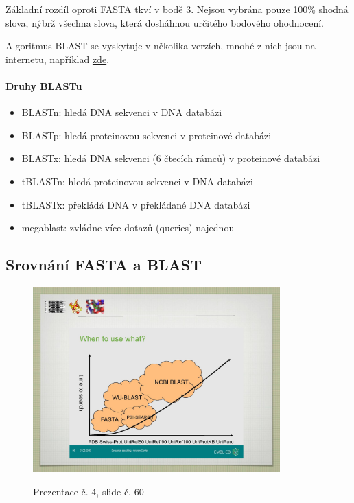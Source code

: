 \documentclass[DIV=8]{scrreprt}
\begin{document}
Základní rozdíl oproti FASTA tkví v bodě 3. Nejsou vybrána pouze 100\% shodná slova, nýbrž všechna slova, která dosháhnou určitého bodového ohodnocení.

Algoritmus BLAST se vyskytuje v několika verzích, mnohé z nich jsou na internetu, například \href{https://blast.ncbi.nlm.nih.gov/Blast.cgi}{zde}.

\paragraph{Druhy BLASTu}
\begin{itemize}[nosep]
    \item BLASTn: hledá DNA sekvenci v DNA databázi
    \item BLASTp: hledá proteinovou sekvenci v proteinové databázi
    \item BLASTx: hledá DNA sekvenci (6 čtecích rámců) v proteinové databázi
    \item tBLASTn: hledá proteinovou sekvenci v DNA databázi
    \item tBLASTx: překládá DNA v překládané DNA databázi
    \item megablast: zvládne více dotazů (queries) najednou
\end{itemize}



\subsection{Srovnání FASTA a BLAST} \label{Srovnání FASTA a BLAST}


\begin{figure}
    \caption{Prezentace č. 4, slide č. 60}
    \includegraphics[width=0.85\textwidth]{slides-4/slide-60.jpg}
    \centering
    \label{slides-4-slide-60}
\end{figure}
\end{document}
